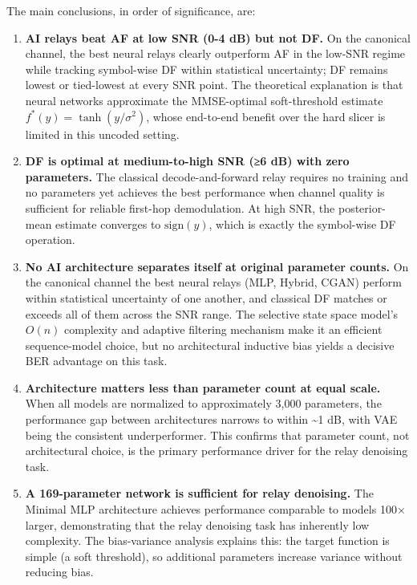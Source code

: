 The main conclusions, in order of significance, are:

\begin{enumerate}
\def\labelenumi{\arabic{enumi}.}
\item
  \textbf{AI relays beat AF at low SNR (0-4 dB) but not DF.} On the canonical channel, the best neural relays clearly outperform AF in the low-SNR regime while tracking symbol-wise DF within statistical uncertainty; DF remains lowest or tied-lowest at every SNR point. The theoretical explanation is that neural networks approximate the MMSE-optimal soft-threshold estimate \(f^*(y) = \tanh(y/\sigma^2)\), whose end-to-end benefit over the hard slicer is limited in this uncoded setting.
\item
  \textbf{DF is optimal at medium-to-high SNR (≥6 dB) with zero parameters.} The classical decode-and-forward relay requires no training and no parameters yet achieves the best performance when channel quality is sufficient for reliable first-hop demodulation. At high SNR, the posterior-mean estimate converges to \(\text{sign}(y)\), which is exactly the symbol-wise DF operation.
\item
  \textbf{No AI architecture separates itself at original parameter counts.} On the canonical channel the best neural relays (MLP, Hybrid, CGAN) perform within statistical uncertainty of one another, and classical DF matches or exceeds all of them across the SNR range. The selective state space model's \(O(n)\) complexity and adaptive filtering mechanism make it an efficient sequence-model choice, but no architectural inductive bias yields a decisive BER advantage on this task.
\item
  \textbf{Architecture matters less than parameter count at equal scale.} When all models are normalized to approximately 3,000 parameters, the performance gap between architectures narrows to within \textasciitilde1 dB, with VAE being the consistent underperformer. This confirms that parameter count, not architectural choice, is the primary performance driver for the relay denoising task.
\item
  \textbf{A 169-parameter network is sufficient for relay denoising.} The Minimal MLP architecture achieves performance comparable to models 100× larger, demonstrating that the relay denoising task has inherently low complexity. The bias-variance analysis explains this: the target function is simple (a soft threshold), so additional parameters increase variance without reducing bias.

\end{enumerate}
